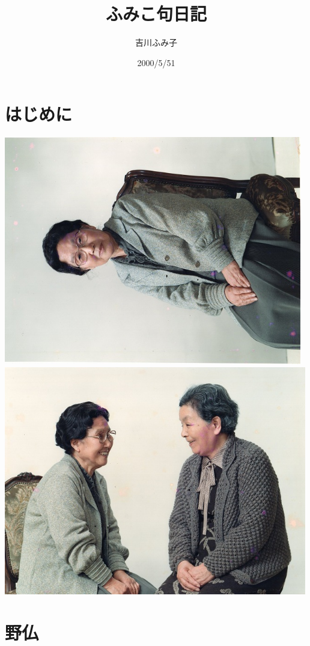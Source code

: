 \documentclass[b5paper]{tbook}
\begin{document}
\author{吉川ふみ子}
\title{ふみこ句日記}
\date{2000/5/51}
\maketitle
\tableofcontents
\chapter*{はじめに}

\includegraphics[height=10cm, angle=90, bb=0 0 640 640]{cat.jpg}
\includegraphics[height=10cm, angle=90, bb=0 0 640 640]{fumiko2.jpg}
\chapter{野仏}
\end{document}
